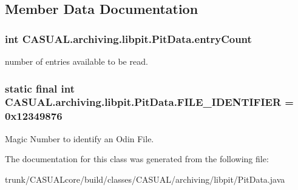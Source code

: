 \subsection{Member Data Documentation}
\hypertarget{class_c_a_s_u_a_l_1_1archiving_1_1libpit_1_1_pit_data_a2532f4f5a317e6e8014f06d0f4625294}{
\subsubsection[{entry\-Count}]{\setlength{\rightskip}{0pt plus 5cm}int C\-A\-S\-U\-A\-L.\-archiving.\-libpit.\-Pit\-Data.\-entry\-Count}}\label{class_c_a_s_u_a_l_1_1archiving_1_1libpit_1_1_pit_data_a2532f4f5a317e6e8014f06d0f4625294}
number of entries available to be read. \hypertarget{class_c_a_s_u_a_l_1_1archiving_1_1libpit_1_1_pit_data_ac0cd0f93311de091c28229ad1e9b1fee}{
\subsubsection[{F\-I\-L\-E\-\_\-\-I\-D\-E\-N\-T\-I\-F\-I\-E\-R}]{\setlength{\rightskip}{0pt plus 5cm}static final int C\-A\-S\-U\-A\-L.\-archiving.\-libpit.\-Pit\-Data.\-F\-I\-L\-E\-\_\-\-I\-D\-E\-N\-T\-I\-F\-I\-E\-R = 0x12349876\hspace{0.3cm}{\ttfamily [static]}}}\label{class_c_a_s_u_a_l_1_1archiving_1_1libpit_1_1_pit_data_ac0cd0f93311de091c28229ad1e9b1fee}
Magic Number to identify an Odin File. 

The documentation for this class was generated from the following file\-:\begin{DoxyCompactItemize}
\item 
trunk/\-C\-A\-S\-U\-A\-Lcore/build/classes/\-C\-A\-S\-U\-A\-L/archiving/libpit/Pit\-Data.\-java\end{DoxyCompactItemize}
